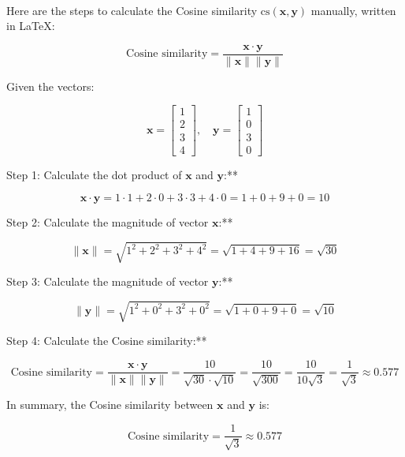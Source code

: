 \begin{flushleft} \\
    Here are the steps to calculate the Cosine similarity \(\text{cs}(\mathbf{x}, \mathbf{y})\) manually, written in LaTeX:
    
    \[
    \text{Cosine similarity} = \frac{\mathbf{x} \cdot \mathbf{y}}{\|\mathbf{x}\| \|\mathbf{y}\|}
    \]
    
    Given the vectors:
    
    \[
    \mathbf{x} = \begin{bmatrix} 1 \\ 2 \\ 3 \\ 4 \end{bmatrix}, \quad \mathbf{y} = \begin{bmatrix} 1 \\ 0 \\ 3 \\ 0 \end{bmatrix}
    \]
    
    Step 1: Calculate the dot product of \(\mathbf{x}\) and \(\mathbf{y}\):**
    
    \[
    \mathbf{x} \cdot \mathbf{y} = 1 \cdot 1 + 2 \cdot 0 + 3 \cdot 3 + 4 \cdot 0 = 1 + 0 + 9 + 0 = 10
    \]
    
    Step 2: Calculate the magnitude of vector \(\mathbf{x}\):**
    
    \[
    \|\mathbf{x}\| = \sqrt{1^2 + 2^2 + 3^2 + 4^2} = \sqrt{1 + 4 + 9 + 16} = \sqrt{30}
    \]
    
    Step 3: Calculate the magnitude of vector \(\mathbf{y}\):**
    
    \[
    \|\mathbf{y}\| = \sqrt{1^2 + 0^2 + 3^2 + 0^2} = \sqrt{1 + 0 + 9 + 0} = \sqrt{10}
    \]
    
    Step 4: Calculate the Cosine similarity:**
    
    \[
    \text{Cosine similarity} = \frac{\mathbf{x} \cdot \mathbf{y}}{\|\mathbf{x}\| \|\mathbf{y}\|} = \frac{10}{\sqrt{30} \cdot \sqrt{10}} = \frac{10}{\sqrt{300}} = \frac{10}{10\sqrt{3}} = \frac{1}{\sqrt{3}} \approx 0.577
    \]
    
    In summary, the Cosine similarity between \(\mathbf{x}\) and \(\mathbf{y}\) is:
    
    \[
    \text{Cosine similarity} = \frac{1}{\sqrt{3}} \approx 0.577
    \]
    
    \end{flushleft}